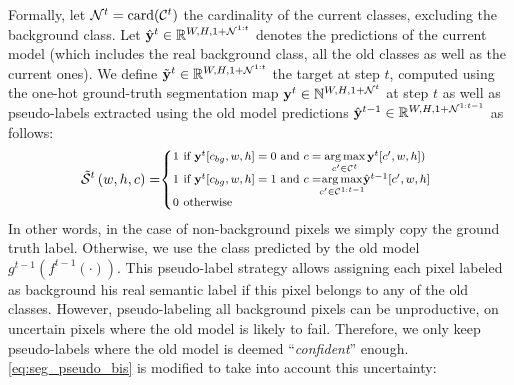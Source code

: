 Formally, let $\mathcal{N}^t=\operatorname{card}(\mathcal{C}^{t})$ the cardinality of the current classes,
excluding the background class. Let $\hat{\mathbf{y}}^{t} \in \mathbb{R}^{W,H,1+\mathcal{N}^{1:t}}$ denotes the
predictions of the current model (which includes the real background class, all the old classes as
well as the current ones). We define $\tilde{\mathbf{y}}^{t} \in \mathbb{R}^{W,H,1+\mathcal{N}^{1:t}}$ the target
at step $t$, computed using the one-hot ground-truth segmentation map $\mathbf{y}^{t} \in
    \mathbb{N}^{W,H,1+\mathcal{N}^t}$ at step $t$ as well as pseudo-labels extracted using the old model
predictions $\hat{\mathbf{y}}^{t-1} \in \mathbb{R}^{W,H,1+\mathcal{N}^{1:t-1}}$ as follows:
%
\begin{equation}
    \footnotesize
    \tilde \mcS^{t}\left(w,h,c\right)= \mkern-5mu \left\{\begin{array}{ll}
        \mkern-10mu 1 \mkern-27mu & \text { if } \vy^{t} [c_{bg},w,h]=0 \text { and } c = \argmax \limits_{c' \in \mcC^{t}} \vy^{t}[c',w,h])                                 \\
        \mkern-10mu 1 \mkern-27mu & \text { if } \vy^{t}[c_{bg},w,h]=1 \text { and } c = \mkern-8mu \argmax \limits_{c' \in \mcC^{1:t-1}} \mkern-6mu \hat{\vy}^{t-1}[c',w,h] \\
        \mkern-10mu 0 \mkern-27mu & \text { otherwise }                                                                                                                      \\
    \end{array}\right.
    \label{eq:seg_pseudo_bis}
\end{equation}
%
In other words, in the case of non-background pixels we simply copy the ground truth label.
Otherwise, we use the class predicted by the old model $g^{t-1}(f^{t-1}(\cdot))$. This pseudo-label
strategy allows assigning each pixel labeled as background his real semantic label if this pixel
belongs to any of the old classes. However, pseudo-labeling all background pixels can be
unproductive, \eg on uncertain pixels where the old model is likely to fail. Therefore, we only keep
pseudo-labels where the old model is deemed ``\textit{confident}'' enough.
\autoref{eq:seg_pseudo_bis} is modified to take into account this uncertainty:
%
